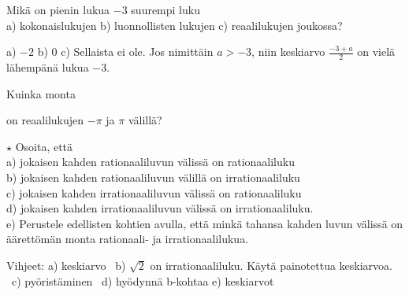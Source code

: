 \begin{tehtavasivu}
\begin{tehtava}%
\begin{alakohdat}
\end{alakohdat}
\begin{vastaus}
\begin{alakohdat}
\end{alakohdat}
\end{vastaus}
\end{tehtava}


\begin{tehtava}
Mikä on pienin lukua $-3$ suurempi luku \\
a) kokonaislukujen b) luonnollisten lukujen c) reaalilukujen joukossa?
\begin{vastaus}
a) $-2$ b) $0$ c) Sellaista ei ole. Jos nimittäin $a > -3$, niin keskiarvo
$\frac{-3+a}{2}$ on vielä lähempänä lukua $-3$. 
\end{vastaus}
\end{tehtava}

\begin{tehtava}
Kuinka monta 
\begin{alakohdat}
\end{alakohdat}
on reaalilukujen \(-\pi\) ja \(\pi\) välillä?
\begin{vastaus}
\begin{alakohdat}
\end{alakohdat}
\end{vastaus}
\end{tehtava}

\begin{tehtava}
$\star$ Osoita, että \\
a) jokaisen kahden rationaaliluvun välissä on rationaaliluku \\
b) jokaisen kahden rationaaliluvun välillä on irrationaaliluku \\
c) jokaisen kahden irrationaaliluvun välissä on rationaaliluku \\
d) jokaisen kahden irrationaaliluvun välissä on irrationaaliluku. \\
e) Perustele edellisten kohtien avulla, että minkä tahansa kahden luvun
välissä on äärettömän monta rationaali- ja irrationaalilukua.
\begin{vastaus}
Vihjeet: a) keskiarvo \ b) $\sqrt{2}$ on irrationaaliluku. Käytä
painotettua keskiarvoa. \ c) pyöristäminen \ d) hyödynnä b-kohtaa
e) keskiarvot %
\end{vastaus}
\end{tehtava}

\end{tehtavasivu}
